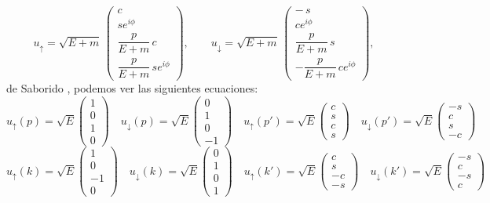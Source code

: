 \[
u_{\uparrow} = \sqrt{E + m}\,
\begin{pmatrix}
c \\[6pt]
s e^{i\phi} \\[6pt]
\dfrac{p}{E + m}\, c \\[6pt]
\dfrac{p}{E + m}\, s e^{i\phi}
\end{pmatrix},
\qquad
u_{\downarrow} = \sqrt{E + m}\,
\begin{pmatrix}
-\,s \\[6pt]
c e^{i\phi} \\[6pt]
\dfrac{p}{E + m}\, s \\[6pt]
-\dfrac{p}{E + m}\, c e^{i\phi}
\end{pmatrix},
\]
de Saborido \cite{SaboridoSilva2025ParticlePhysicsI}, podemos ver las siguientes ecuaciones: 
\begin{equation}
	u_\uparrow(p) = \sqrt{E} \begin{pmatrix}
		1 \\ 0 \\ 1 \\ 0
	\end{pmatrix} \quad
	u_\downarrow(p)= \sqrt{E} \begin{pmatrix}
		0 \\ 1 \\ 0 \\ -1
	\end{pmatrix}\quad
	u_\uparrow(p') = \sqrt{E} \begin{pmatrix}
		c \\ s \\ c \\ s
	\end{pmatrix} \quad
	u_\downarrow(p')= \sqrt{E} \begin{pmatrix}
		-s \\ c \\ s \\ -c
	\end{pmatrix}
\end{equation}
\begin{equation}
	u_\uparrow(k) = \sqrt{E} \begin{pmatrix}
		1 \\ 0 \\ -1 \\ 0
	\end{pmatrix} \quad
	u_\downarrow(k)= \sqrt{E} \begin{pmatrix}
		0 \\ 1 \\ 0 \\ 1
	\end{pmatrix}  \quad
	u_\uparrow(k') = \sqrt{E} \begin{pmatrix}
		c \\ s \\ -c \\ -s
	\end{pmatrix} \quad
	u_\downarrow(k')= \sqrt{E} \begin{pmatrix}
		-s \\ c \\ -s \\ c
	\end{pmatrix}
\end{equation}
